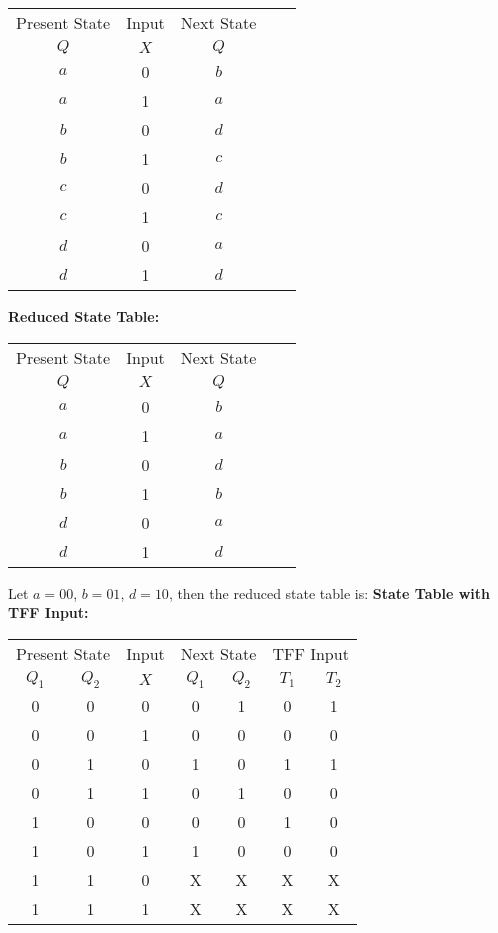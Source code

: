 \documentclass[a4paper,12pt]{article}
\begin{document}
\begin{center}
	\begin{tabular}{ccccc}
		\toprule
		Present State & Input & Next State \\
		\cmidrule(lr){1-1} \cmidrule(lr){2-2} \cmidrule(lr){3-3}
		$Q$ & $X$ & $Q$ \\
		\midrule
		$a$ & 0 & $b$ \\
		$a$ & 1 & $a$ \\
		$b$ & 0 & $d$ \\
		$b$ & 1 & $c$ \\
		$c$ & 0 & $d$ \\
		$c$ & 1 & $c$ \\
		$d$ & 0 & $a$ \\
		$d$ & 1 & $d$ \\
		\bottomrule
	\end{tabular}
\end{center}

\textbf{Reduced State Table:}

\begin{center}
	\begin{tabular}{ccccc}
		\toprule
		Present State & Input & Next State \\
		\cmidrule(lr){1-1} \cmidrule(lr){2-2} \cmidrule(lr){3-3}
		$Q$ & $X$ & $Q$ \\
		\midrule
		$a$ & 0 & $b$ \\
		$a$ & 1 & $a$ \\
		$b$ & 0 & $d$ \\
		$b$ & 1 & $b$ \\
		$d$ & 0 & $a$ \\
		$d$ & 1 & $d$ \\
		\bottomrule
	\end{tabular}
\end{center}

Let $a = 00$, $b = 01$, $d = 10$, then the reduced state table is:
\textbf{State Table with TFF Input:}

\begin{center}
	\begin{tabular}{ccccccc}
		\toprule
		\multicolumn{2}{c}{Present State} & Input & \multicolumn{2}{c}{Next State} & \multicolumn{2}{c}{TFF Input} \\
		\cmidrule(lr){1-2} \cmidrule(lr){3-3} \cmidrule(lr){4-5} \cmidrule(lr){6-7}
		$Q_1$ & $Q_2$ & $X$ & $Q_1$ & $Q_2$ & $T_1$ & $T_2$ \\
		\midrule
		0 & 0 & 0 & 0 & 1 & 0 & 1 \\
		0 & 0 & 1 & 0 & 0 & 0 & 0 \\
		0 & 1 & 0 & 1 & 0 & 1 & 1 \\
		0 & 1 & 1 & 0 & 1 & 0 & 0 \\
		1 & 0 & 0 & 0 & 0 & 1 & 0 \\
		1 & 0 & 1 & 1 & 0 & 0 & 0 \\
		1 & 1 & 0 & X & X & X & X \\
		1 & 1 & 1 & X & X & X & X \\
		\bottomrule
	\end{tabular}
\end{center}
\end{document}
